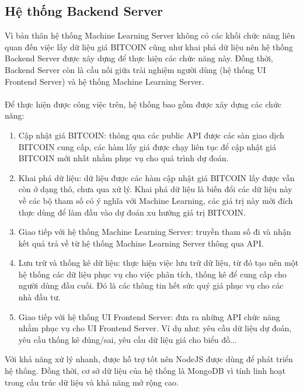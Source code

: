 \subsection{ Hệ thống Backend Server}
Vì bản thân hệ thống Machine Learning Server không có các khối chức năng 
liên quan đến việc  
lấy dữ liệu giá BITCOIN cũng như khai phá dữ liệu nên hệ thống Backend Server
được xây dựng để thực hiện các chức năng này. Đồng thời, Backend Server còn là 
cầu nối giữa trải nghiệm người dùng (hệ thống UI Frontend Server) và hệ thống 
Machine Learning Server.\\\\
Để thực hiện được công việc trên, hệ thống bao gồm được xây dựng các chức năng:\\
\begin{enumerate}
\item Cập nhật giá BITCOIN: thông qua các public API được các sàn giao dịch 
BITCOIN cung cấp, các hàm lấy giá được chạy liên tục để cập nhật giá BITCOIN 
mới nhất nhằm phục vụ cho quá trình dự đoán.
\item Khai phá dữ liệu: dữ liệu được các hàm cập nhật giá BITCOIN lấy được vẫn 
còn ở dạng thô, chưa qua xử lý. Khai phá dữ liệu là biến đổi các dữ liệu này 
về các bộ tham số có ý nghĩa với Machine Learning, các giá trị này mới đích thực 
dùng để làm đầu vào dự đoán xu hướng giá trị BITCOIN.
\item Giao tiếp với hệ thống Machine Learning Server: truyền tham số đi và nhận 
kết quả trả về từ hệ thống Machine Learning Server thông qua API.
\item Lưu trữ và thống kê dữ liệu: thực hiện việc lưu trữ dữ liệu, từ đó tạo nên 
một hệ thống các dữ liệu phục vụ cho việc phân tích, thống kê để cung cấp cho người 
dùng đầu cuối. Đó là các thông tin hết sức quý giá phục vụ cho các nhà đầu tư.
\item Giao tiếp với hệ thống UI Frontend Server: đưa ra những API chức năng nhằm 
phục vụ cho UI Frontend Server. Ví dụ như: yêu cầu dữ liệu dự đoán, yêu cầu 
thống kê đúng/sai, yêu cầu dữ liệu giá cho biểu đồ...
\end{enumerate}
Với khả năng xử lý nhanh, được hỗ trợ tốt nên NodeJS được dùng để phát triển 
hệ thống. Đồng thời, cơ sở dữ liệu của hệ thống là MongoDB vì tính linh hoạt 
trong cấu trúc dữ liệu và khả năng mở rộng cao.\\\\
